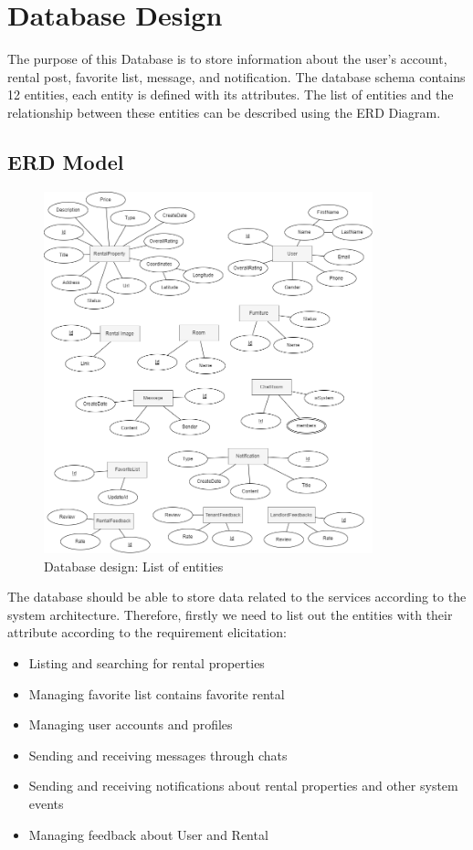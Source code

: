 \newpage
\section{Database Design}
The purpose of this Database is to store information about the user's account, rental post, favorite list, message, and notification. The database schema contains 12 entities, each entity is defined with its attributes. The list of entities and the relationship between these entities can be described using the ERD Diagram. 
\subsection{ERD Model}
\begin{figure}[H]
    \centering
    \includegraphics[width=0.85\textwidth]{Images/ERD.png}
    \caption{Database design: List of entities}
    \label{fig:DB-list-entities}
\end{figure}
The database should be able to store data related to the services according to the system architecture. Therefore, firstly we need to list out the entities with their attribute according to the requirement elicitation:
\begin{itemize}
    \item Listing and searching for rental properties
    \item Managing favorite list contains favorite rental
    \item Managing user accounts and profiles
    \item Sending and receiving messages through chats
    \item Sending and receiving notifications about rental properties and other system events
    \item Managing feedback about User and Rental
\end{itemize}

